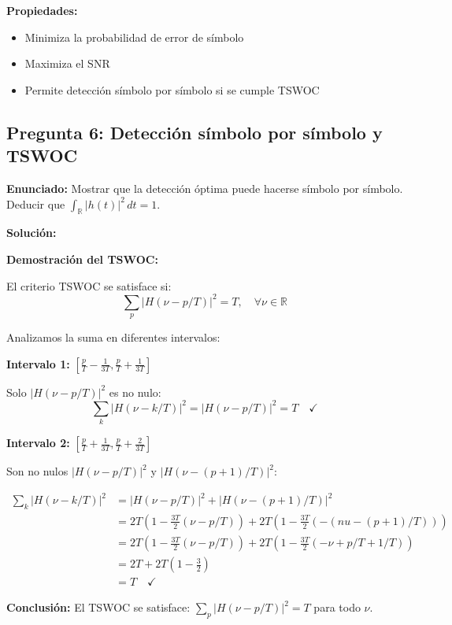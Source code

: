 \documentclass[11pt,a4paper]{article}
\begin{document}
\textbf{Propiedades:}
\begin{itemize}
    \item Minimiza la probabilidad de error de s\'imbolo
    \item Maximiza el SNR
    \item Permite detecci\'on s\'imbolo por s\'imbolo si se cumple TSWOC
\end{itemize}



\subsection*{Pregunta 6: Detecci\'on s\'imbolo por s\'imbolo y TSWOC}

\textbf{Enunciado:} Mostrar que la detecci\'on \'optima puede hacerse s\'imbolo por s\'imbolo. Deducir que $\int_{\mathbb{R}} |h(t)|^2\, dt = 1$.

\vspace{0.3cm}
\textbf{Soluci\'on:}

\textbf{Demostraci\'on del TSWOC:}

El criterio TSWOC se satisface si:
\[
\sum_p |H(\nu - p/T)|^2 = T, \quad \forall \nu \in \mathbb{R}
\]

Analizamos la suma en diferentes intervalos:

\textbf{Intervalo 1:} $\left[\frac{p}{T} - \frac{1}{3T}, \frac{p}{T} + \frac{1}{3T}\right]$

Solo $|H(\nu - p/T)|^2$ es no nulo:
\[
\sum_k |H(\nu - k/T)|^2 = |H(\nu - p/T)|^2 = T \quad ✓
\]

\textbf{Intervalo 2:} $\left[\frac{p}{T} + \frac{1}{3T}, \frac{p}{T} + \frac{2}{3T}\right]$

Son no nulos $|H(\nu - p/T)|^2$ y $|H(\nu - (p+1)/T)|^2$:

\begin{align*}
\sum_k |H(\nu - k/T)|^2 &= |H(\nu - p/T)|^2 + |H(\nu - (p+1)/T)|^2 \\
&= 2T\left(1 - \frac{3T}{2}(\nu - p/T)\right) + 2T\left(1 - \frac{3T}{2}(-(nu - (p+1)/T))\right) \\
&= 2T\left(1 - \frac{3T}{2}(\nu - p/T)\right) + 2T\left(1 - \frac{3T}{2}(-\nu + p/T + 1/T)\right) \\
&= 2T + 2T\left(1 - \frac{3}{2}\right) \\
&= T \quad ✓
\end{align*}

\textbf{Conclusi\'on:} El TSWOC se satisface: $\sum_p |H(\nu - p/T)|^2 = T$ para todo $\nu$.
\end{document}
